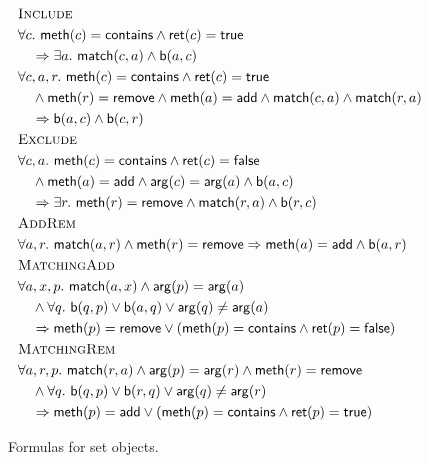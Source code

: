 \begin{figure}

  \footnotesize
  \begin{align*}
    & \textsc{Include} \\
    & \forall c.\ {\sf meth}(c) = {\sf contains} \land {\sf ret}(c) = {\sf true} \\
    & \quad \implies \exists a.\ {\sf match}(c,a) \land {\sf b}(a,c) \\
    & \forall c,a,r.\ {\sf meth}(c)={\sf contains} \land {\sf ret}(c) = {\sf true} \\
    & \quad \land {\sf meth}(r) = {\sf remove}\land {\sf meth}(a) = {\sf add} \land  {\sf match}(c,a) \land {\sf match}(r,a)  \\
    & \quad \implies {\sf b}(a,c) \land {\sf b}(c,r)
    \\
    & \textsc{Exclude} \\
    & \forall c,a.\ {\sf meth}(c)={\sf contains} \land {\sf ret}(c) = {\sf false} \\
    & \quad \land {\sf meth}(a) = {\sf add}\land {\sf arg}(c) = {\sf arg}(a) \land {\sf b}(a,c) \\
    & \quad \implies \exists r.\ {\sf meth}(r)={\sf remove} \land {\sf match}(r,a) \land {\sf b}(r,c)
    \\
    & \textsc{AddRem} \\
    & \forall a,r.\ {\sf match}(a,r) \land {\sf meth}(r) = {\sf remove}  \implies {\sf meth}(a)={\sf add} \land {\sf b}(a,r) 
    \\
    & \textsc{MatchingAdd} \\
    & \forall a,x,p.\ {\sf match}(a,x) \land {\sf arg}(p) = {\sf arg}(a) \\
    & \quad \land \forall q.\ {\sf b}(q,p) \vee {\sf b}(a,q) \vee {\sf arg}(q)\neq {\sf arg}(a) \\
    & \quad \implies {\sf meth}(p)={\sf remove} \vee ({\sf meth}(p)={\sf contains} \land {\sf ret}(p) = {\sf false}) 
    \\
    & \textsc{MatchingRem} \\
    & \forall a,r,p.\ {\sf match}(r,a) \land {\sf arg}(p) = {\sf arg}(r) \land {\sf meth}(r)={\sf remove}\\
    & \quad \land \forall q.\ {\sf b}(q,p) \vee {\sf b}(r,q) \vee {\sf arg}(q)\neq {\sf arg}(r) \\
    & \quad \implies {\sf meth}(p)={\sf add} \vee ({\sf meth}(p)={\sf contains} \land {\sf ret}(p) = {\sf true}) 
  \end{align*}

  \caption{Formulas for set objects.}
  \label{fig:formulas:set}

\end{figure}

